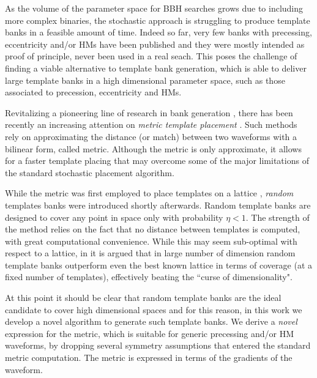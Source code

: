 \documentclass[twocolumn,showpacs,preprintnumbers,nofootinbib,prd,
superscriptaddress,10pt]{revtex4-2}
\begin{document}
As the volume of the parameter space for BBH searches grows due to including more complex binaries, the stochastic approach is struggling to produce template banks in a feasible amount of time.
Indeed so far, very few banks with precessing, eccentricity and/or HMs have been published \cite{Harry:2016ijz, Harry:2017weg} and they were  mostly intended as proof of principle, never been used in a real seach.
This poses the challenge of finding a viable alternative to template bank generation, which is able to deliver large template banks in a high dimensional parameter space, such as those associated to precession, eccentricity and HMs.

Revitalizing a pioneering line of research in bank generation \cite{owen_metric, Messenger:2008ta, Prix:2007ks, Brown:2012qf, Keppel:2013uma}, there has been recently an increasing attention on {\it metric template placement} \cite{Roy:2017oul, 2018cosp...42E2899R, Coogan:2022qxs, Hanna:2022zpk}.
Such methods rely on approximating the distance (or match) between two waveforms with a bilinear form, called metric.
Although the metric is only approximate, it allows for a faster template placing that may overcome some of the major limitations of the standard stochastic placement algorithm.

While the metric was first employed to place templates on a lattice \cite{owen_metric, Prix:2007ks}, {\it random} templates banks \cite{Messenger:2008ta} were introduced shortly afterwards.
Random template banks are designed to cover any point in space only with probability $\eta<1$.
The strength of the method relies on the fact that no distance between templates is computed, with great computational convenience.
While this may seem sub-optimal with respect to a lattice, in \cite{Messenger:2008ta, Allen:2022lqr, Allen:2021yuy} it is argued that in large number of dimension random template banks outperform even the best known lattice in terms of coverage (at a fixed number of templates), effectively beating the ``curse of dimensionality".

At this point it should be clear that random template banks are the ideal candidate to cover high dimensional spaces and for this reason, in this work we develop a novel algorithm to generate such template banks.
We derive a {\it novel} expression for the metric, which is suitable for generic precessing and/or HM waveforms, by dropping several symmetry assumptions that entered the standard metric computation. The metric is expressed in terms of the gradients of the waveform.
\end{document}
